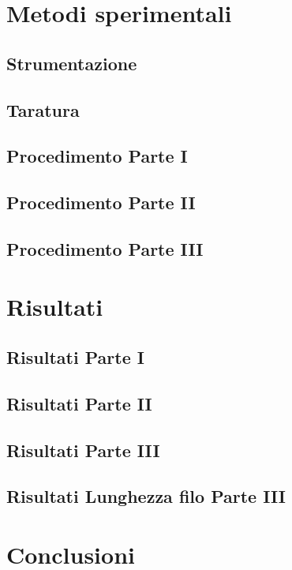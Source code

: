 \documentclass{article}
\begin{document}
\section{Metodi sperimentali}
\subsection{Strumentazione}

\subsection{Taratura}

\subsection{Procedimento Parte I}

\subsection{Procedimento Parte II}


\subsection{Procedimento Parte III}


\section{Risultati}
\subsection{Risultati Parte I}


\subsection{Risultati Parte II}


\subsection{Risultati Parte III}


\subsection{Risultati Lunghezza filo Parte III}

\section{Conclusioni}

\end{document}
